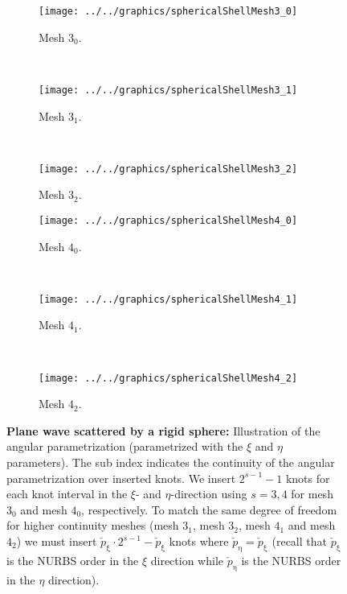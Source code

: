 \begin{figure}
	\centering        
	\begin{subfigure}{0.23\textwidth}
		\centering
		\texttt{[image: ../../graphics/sphericalShellMesh3\_0]}
		\caption{Mesh $3_0$.}
		\label{Fig2:SphericalShellMesh3_0}
	\end{subfigure}
	~
	\begin{subfigure}{0.23\textwidth}
		\centering
		\texttt{[image: ../../graphics/sphericalShellMesh3\_1]}
		\caption{Mesh $3_1$.}
		\label{Fig2:SphericalShellMesh3_1}
	\end{subfigure}
	~
	\begin{subfigure}{0.23\textwidth}
		\centering
		\texttt{[image: ../../graphics/sphericalShellMesh3\_2]}
		\caption{Mesh $3_2$.}
		\label{Fig2:SphericalShellMesh3_2}
	\end{subfigure}
	\par\bigskip  
	\begin{subfigure}{0.23\textwidth}
		\centering
		\texttt{[image: ../../graphics/sphericalShellMesh4\_0]}
		\caption{Mesh $4_0$.}
		\label{Fig2:SphericalShellMesh4_0}
	\end{subfigure}
	~
	\begin{subfigure}{0.23\textwidth}
		\centering
		\texttt{[image: ../../graphics/sphericalShellMesh4\_1]}
		\caption{Mesh $4_1$.}
		\label{Fig2:SphericalShellMesh4_1}
	\end{subfigure}
	~
	\begin{subfigure}{0.23\textwidth}
		\centering
		\texttt{[image: ../../graphics/sphericalShellMesh4\_2]}
		\caption{Mesh $4_2$.}
		\label{Fig2:SphericalShellMesh4_2}
	\end{subfigure}
	\caption{\textbf{Plane wave scattered by a rigid sphere:} Illustration of the angular parametrization (parametrized with the $\xi$ and $\eta$ parameters). The sub index indicates the continuity of the angular parametrization over inserted knots. We insert $2^{s-1}-1$ knots for each knot interval in the $\xi$- and $\eta$-direction using $s=3,4$ for mesh $3_0$ and mesh $4_0$, respectively. To match the same degree of freedom for higher continuity meshes (mesh $3_1$, mesh $3_2$, mesh $4_1$ and mesh $4_2$) we must insert $\check{p}_\upxi\cdot 2^{s-1}-\check{p}_\upxi$ knots where $\check{p}_\upeta=\check{p}_\upxi$ (recall that $\check{p}_\upxi$ is the NURBS order in the $\xi$ direction while $\check{p}_\upeta$ is the NURBS order in the $\eta$ direction).}
	\label{Fig2:SphericalShellMesh34_p}
\end{figure}

